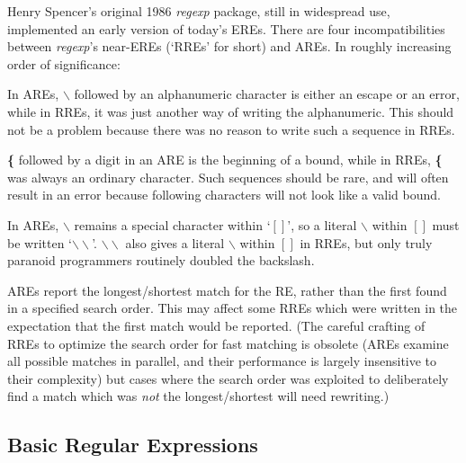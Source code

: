 Henry Spencer's original 1986 {\it regexp} package, still in widespread use,
implemented an early version of today's EREs. There are four incompatibilities between {\it regexp}'s
near-EREs (`RREs' for short) and AREs. In roughly increasing order of significance:
{\itemize
\item In AREs, {\bf $\backslash$} followed by an alphanumeric character is either an escape or
an error, while in RREs, it was just another way of writing the  alphanumeric.
This should not be a problem because there was no reason to write such
a sequence in RREs. 

\item {\bf \{} followed by a digit in an ARE is the beginning of
a bound, while in RREs, {\bf \{} was always an ordinary character. Such sequences
should be rare, and will often result in an error because following characters
will not look like a valid bound. 

\item In AREs, {\bf $\backslash$} remains a special character
within `{\bf $[]$}', so a literal {\bf $\backslash$} within {\bf $[]$} must be
written `{\bf $\backslash\backslash$}'. {\bf $\backslash\backslash$} also gives a literal
 {\bf $\backslash$} within {\bf $[]$} in RREs, but only truly paranoid programmers routinely doubled
the backslash. 

\item AREs report the longest/shortest match for the RE, rather
than the first found in a specified search order. This may affect some RREs
which were written in the expectation that the first match would be reported.
(The careful crafting of RREs to optimize the search order for fast matching
is obsolete (AREs examine all possible matches in parallel, and their performance
is largely insensitive to their complexity) but cases where the search
order was exploited to deliberately  find a match which was {\it not} the longest/shortest
will need rewriting.)  
}

\subsection{Basic Regular Expressions}\label{wxresynbre}


